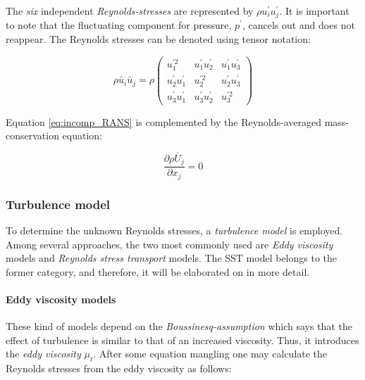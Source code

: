 \noindent The \textit{six} independent \textit{Reynolds-stresses} are
represented by $\rho u_{i}^{\prime} u_{j}^{\prime}$. It is important to note
that the fluctuating component for pressure, $p^{\prime}$, cancels out and does
not reappear. The Reynolds stresses can be denoted using tensor notation:

\begin{equation}
    \rho \bar u_{i} \bar u_{j} = \rho
    \begin{pmatrix}
        u_{1}^{\prime 2}              & u_{1}^{\prime} u_{2}^{\prime} & 
        u_{1}^{\prime} u_{3}^{\prime} \\

        u_{2}^{\prime} u_{1}^{\prime} & u_{2}^{\prime 2}              & 
        u_{2}^{\prime} u_{3}^{\prime} \\

        u_{3}^{\prime} u_{1}^{\prime} & u_{3}^{\prime} u_{2}^{\prime} & 
        u_{3}^{\prime 2}
    \end{pmatrix}
\end{equation}

\noindent Equation \ref{eq:incomp_RANS} is complemented by the Reynolds-averaged
mass-conservation equation:

\begin{equation}
    \frac{\partial \rho \bar U_{j}}{\partial x_{j}} = 0
\end{equation}


\subsubsection{Turbulence model}
To determine the unknown Reynolds stresses, a \textit{turbulence model} is
employed. Among several approaches, the two most commonly used are \textit{Eddy
viscosity} models and \textit{Reynolds stress transport} models. The SST model
belongs to the former category, and therefore, it will be elaborated on in more
detail.


\paragraph{Eddy viscosity models}
These kind of models depend on the \textit{Boussinesq-assumption} which says
that the effect of turbulence is similar to that of an increased viscosity.
Thus, it introduces the \textit{eddy viscosity} $\mu_{t}$. After some equation
mangling one may calculate the Reynolds stresses from the eddy viscosity as
follows:

